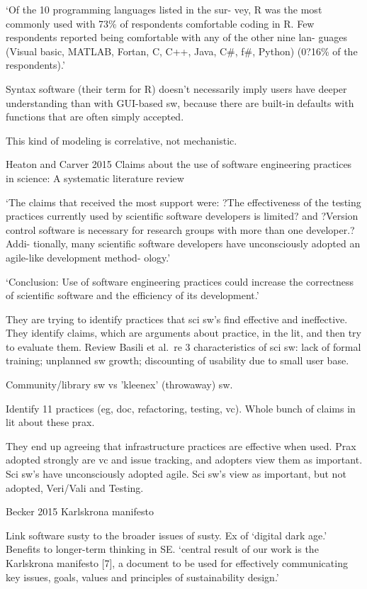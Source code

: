 \documentclass[12pt]{amsart}
\begin{document}
`Of the 10 programming languages listed in the sur- vey, R was the most commonly used with 73\% of respondents comfortable coding in R. Few respondents reported being comfortable with any of the other nine lan- guages (Visual basic, MATLAB, Fortan, C, C++, Java, C\#, f\#, Python) (0?16\% of the respondents).'

Syntax software (their term for R) doesn't necessarily imply users have deeper understanding than with GUI-based sw, because there are built-in defaults with functions that are often simply accepted.

This kind of modeling is correlative, not mechanistic.



Heaton and Carver 2015 Claims about the use of software engineering practices in science: A systematic literature review

`The claims that received the most support were: ?The effectiveness of the testing practices currently used by scientific software developers is limited? and ?Version control software is necessary for research groups with more than one developer.? Addi- tionally, many scientific software developers have unconsciously adopted an agile-like development method- ology.'

`Conclusion: Use of software engineering practices could increase the correctness of scientific software and the efficiency of its development.'

They are trying to identify practices that sci sw's find effective and ineffective. They identify claims, which are arguments about practice, in the lit, and then try to evaluate them. Review Basili et al.\ re 3 characteristics of sci sw: lack of formal training; unplanned sw growth; discounting of usability due to small user base.

Community/library sw vs 'kleenex' (throwaway) sw.

Identify 11 practices (eg, doc, refactoring, testing, vc). Whole bunch of claims in lit about these prax. 

They end up agreeing that infrastructure practices are effective when used. Prax adopted strongly are vc and issue tracking, and adopters view them as important. Sci sw's have unconsciously adopted agile. Sci sw's view as important, but not adopted, Veri/Vali and Testing. 




Becker 2015 Karlskrona manifesto

Link software susty to the broader issues of susty. Ex of `digital dark age.' Benefits to longer-term thinking in SE. `central result of our work is the Karlskrona manifesto [7], a document to be used for effectively communicating key issues, goals, values and principles of sustainability design.' 
\end{document}
